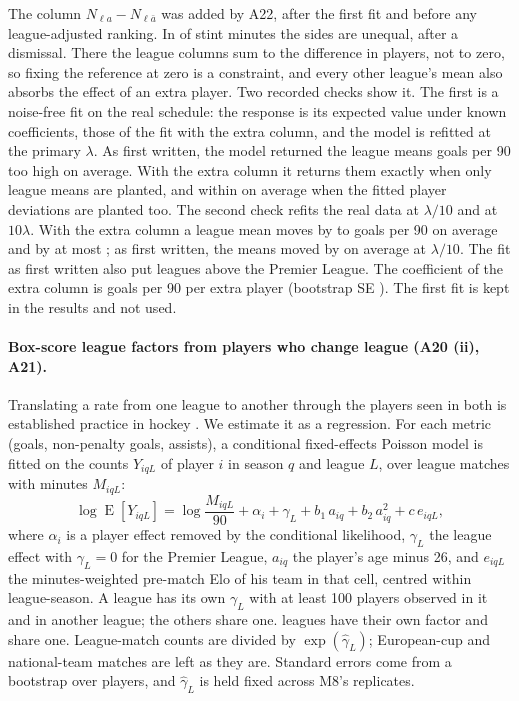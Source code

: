\documentclass[11pt,a4paper]{article}
\DeclareMathOperator{\E}{E}
\begin{document}
The column $N_{\ell a} - N_{\ell \bar a}$ was added by A22, after the first fit
and before any league-adjusted ranking. In \UnequalMinutesShare{} of stint
minutes the sides are unequal, after a dismissal. There the league columns sum
to the difference in players, not to zero, so fixing the reference at zero is a
constraint, and every other league's mean also absorbs the effect of an extra
player. Two recorded checks show it. The first is a noise-free fit on the real
schedule: the response is its expected value under known coefficients, those
of the fit with the extra column, and the model is refitted at the primary
$\lambda$. As first written, the model returned the league means
\LeagueNoiseFreeBias{} goals per 90 too high on average. With the extra column
it returns them exactly when only league means are planted, and within
\LeagueNoiseFreeBiasMen{} on average when the fitted player deviations are
planted too. The second check refits the real data at
$\lambda/10$ and at $10\lambda$. With the extra column a league mean moves by
\LeagueLambdaShiftMeanLo{} to \LeagueLambdaShiftMeanHi{} goals per 90 on
average and by at most \LeagueLambdaShiftMax{}; as first written, the means
moved by \LeagueLambdaShiftAsWritten{} on average at $\lambda/10$. The fit as
first written also put \NLeaguesAboveAsWritten{} leagues above the Premier
League. The coefficient of the extra column is \LeagueMen{} goals per 90 per
extra player (bootstrap SE \LeagueMenSe{}). The first fit is kept in the
results and not used.

\paragraph{Box-score league factors from players who change league (A20 (ii), A21).}
Translating a rate from one league to another through the players seen in both
is established practice in hockey
\citep{desjardins2005equivalencies,bacon2021nhle}. We estimate it as a
regression. For each metric (goals, non-penalty goals, assists), a conditional
fixed-effects Poisson model \citep{hausman1984count} is fitted on the counts
$Y_{iqL}$ of player $i$ in season $q$ and league $L$, over league matches with
minutes $M_{iqL}$:
\begin{equation}
  \log \E[Y_{iqL}] = \log\frac{M_{iqL}}{90} + \alpha_i + \gamma_L
  + b_1\, a_{iq} + b_2\, a_{iq}^2 + c\, e_{iqL},
  \label{eq:league-factor}
\end{equation}
where $\alpha_i$ is a player effect removed by the conditional likelihood,
$\gamma_L$ the league effect with $\gamma_L = 0$ for the Premier League,
$a_{iq}$ the player's age minus 26, and $e_{iqL}$ the minutes-weighted pre-match
Elo of his team in that cell, centred within league-season. A league has its
own $\gamma_L$ with at least 100 players observed in it and in another league;
the others share one. \NLeaguesOwnFactor{} leagues have their own factor and
\NLeaguesPooledFactor{} share one. League-match counts are divided by
$\exp(\hat\gamma_L)$; European-cup and national-team matches are left as they
are. Standard errors come from a bootstrap over players, and $\hat\gamma_L$ is
held fixed across M8's replicates.
\end{document}
